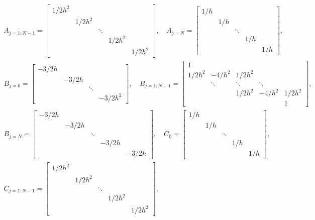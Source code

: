\documentclass[reqno, 12pt]{amsart}
\begin{document}
    \begin{gather*}
        A_{j = 1:N-1} = \begin{bmatrix} 1/2h^2 \\ & 1/2h^2 \\ & & \ddots \\ & & & 1/2h^2 \\&  & & & 1/2h^2 \end{bmatrix}, \quad
        A_{j = N} = \begin{bmatrix} 1/h \\ & 1/h \\ & & \ddots \\ && & 1/h \\ & & & & 1/h \end{bmatrix}, \\
        B_{j = 0} = \begin{bmatrix} -3/2h \\ & -3/2h \\ & & \ddots \\ & & & -3/2h^2 \end{bmatrix}, \quad
        B_{j = 1:N-1} = \begin{bmatrix} 1 \\ 1/2h^2 & -4/h^2 & 1/2h^2 \\ & \ddots & \ddots & \ddots \\ & & 1/2h^2 & -4/h^2 & 1/2h^2 \\ & & & & 1  \end{bmatrix}, \\
        B_{j = N} = \begin{bmatrix} -3/2h \\ & -3/2h \\ & & \ddots \\ & & & -3/2h \\ & & & & -3/2h \end{bmatrix}, \quad
        C_{0} = \begin{bmatrix} 1/h \\ & 1/h \\ && \ddots \\ &&& 1/h \\ &&&& 1/h \end{bmatrix}, \\
        C_{j = 1:N-1} = \begin{bmatrix} 1/2h^2 \\ & 1/2h^2 \\ & & \ddots \\ & & &  1/2h^2 \\ & & & & 1/2h^2 \end{bmatrix}, \quad

\end{gather*}
\end{document}
